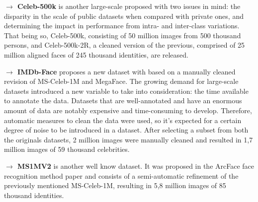 \documentclass[class=report, crop=false, a4paper, 12pt]{standalone}
\begin{document}


\vspace{0.7\baselineskip}
\noindent\textbf{$\rightarrow$ Celeb-500k} \autocite{caoCeleb500KLargeTraining2018} is another large-scale proposed with two issues in mind: the disparity in the scale of public datasets when compared with private ones, and determining the impact in performance from intra- and inter-class variations. That being so, Celeb-500k, consisting of 50 million images from 500 thousand persons, and Celeb-500k-2R, a cleaned version of the previous, comprised of 25 million aligned faces of 245 thousand identities, are released.

\vspace{0.7\baselineskip}
\noindent\textbf{$\rightarrow$ IMDb-Face} \autocite{wangDevilFaceRecognition2018} proposes a new dataset with based on a manually cleaned revision of MS-Celeb-1M and MegaFace. The growing demand for large-scale datasets introduced a new variable to take into consideration: the time available to annotate the data. Datasets that are well-annotated and have an enormous amount of data are notably expensive and time-consuming to develop. Therefore, automatic measures to clean the data were used, so it's expected for a certain degree of noise to be introduced in a dataset. After selecting a subset from both the originals datasets, 2 million images were manually cleaned and resulted in 1,7 million images of 59 thousand celebrities.

\vspace{0.7\baselineskip}
\noindent\textbf{$\rightarrow$ MS1MV2} \autocite{dengArcFaceAdditiveAngular} is another well know dataset. It was proposed in the ArcFace face recognition method paper and consists of a semi-automatic refinement of the previously mentioned MS-Celeb-1M, resulting in 5,8 million images of 85 thousand identities.
\end{document}
